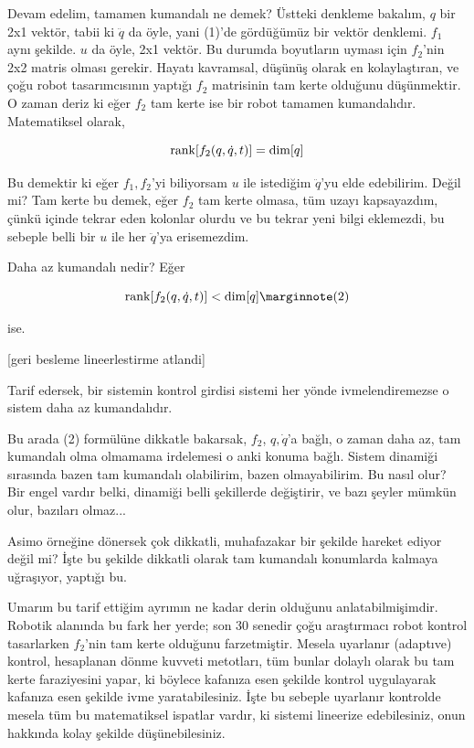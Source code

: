 \documentclass[12pt,fleqn]{article}\usepackage{../../common}
\begin{document}
Devam edelim, tamamen kumandalı ne demek? Üstteki denkleme bakalım, $q$ bir
2x1 vektör, tabii ki $\ddot{q}$ da öyle, yani (1)'de gördüğümüz bir vektör
denklemi. $f_1$ aynı şekilde. $u$ da öyle, 2x1 vektör. Bu durumda
boyutların uyması için $f_2$'nin 2x2 matris olması gerekir. Hayatı
kavramsal, düşünüş olarak en kolaylaştıran, ve çoğu robot tasarımcısının
yaptığı $f_2$ matrisinin tam kerte olduğunu düşünmektir. O zaman deriz ki
eğer $f_2$ tam kerte ise bir robot tamamen kumandalıdır. Matematiksel olarak,

$$
\operatorname{rank} [f_2(q,\dot{q},t)] = \operatorname{dim} [q]
$$

Bu demektir ki eğer $f_1,f_2$'yi biliyorsam $u$ ile istediğim $\ddot{q}$'yu
elde edebilirim. Değil mi? Tam kerte bu demek, eğer $f_2$ tam kerte olmasa,
tüm uzayı kapsayazdım, çünkü içinde tekrar eden kolonlar olurdu ve bu
tekrar yeni bilgi eklemezdi, bu sebeple belli bir $u$ ile her $\ddot{q}$'ya
erisemezdim.

Daha az kumandalı nedir? Eğer 

$$\rank [f_2(q,\dot{q},t)] < \ddim [q] 
\mlabel{2}$$ 

ise. 

[geri besleme lineerlestirme atlandi]

Tarif edersek, bir sistemin kontrol girdisi sistemi her yönde
ivmelendiremezse o sistem daha az kumandalıdır. 

Bu arada (2) formülüne dikkatle bakarsak, $f_2$, $q,\dot{q}$'a bağlı, o
zaman daha az, tam kumandalı olma olmamama irdelemesi o anki konuma
bağlı. Sistem dinamiği sırasında bazen tam kumandalı olabilirim, bazen
olmayabilirim. Bu nasıl olur? Bir engel vardır belki, dinamiği belli
şekillerde değiştirir, ve bazı şeyler mümkün olur, bazıları olmaz... 

Asimo örneğine dönersek çok dikkatli, muhafazakar bir şekilde hareket
ediyor değil mi? İşte bu şekilde dikkatli olarak tam kumandalı konumlarda
kalmaya uğraşıyor, yaptığı bu. 

Umarım bu tarif ettiğim ayrımın ne kadar derin olduğunu
anlatabilmişimdir. Robotik alanında bu fark her yerde; son 30 senedir çoğu
araştırmacı robot kontrol tasarlarken $f_2$'nin tam kerte olduğunu
farzetmiştir. Mesela uyarlanır (adaptıve) kontrol, hesaplanan dönme kuvveti
metotları, tüm bunlar dolaylı olarak bu tam kerte faraziyesini yapar, ki
böylece kafanıza esen şekilde kontrol uygulayarak kafanıza esen şekilde
ivme yaratabilesiniz.  İşte bu sebeple uyarlanır kontrolde mesela tüm bu
matematiksel ispatlar vardır, ki sistemi lineerize edebilesiniz, onun
hakkında kolay şekilde düşünebilesiniz.
\end{document}
